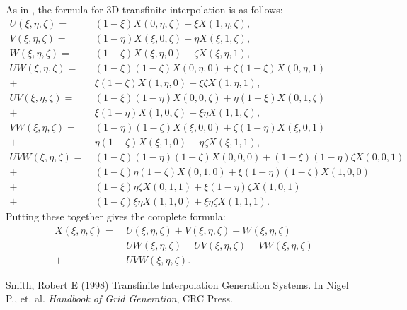 \documentclass{article}
\newcommand{\ba}[1]{\begin{align*}    #1    \end{align*}}
\begin{document}
As in \cite{smith}, the formula for 3D transfinite interpolation is as follows:
\ba{
U(\xi, \eta, \zeta) = & \ (1-\xi)X(0,\eta, \zeta) + \xi X(1,\eta, \zeta), \\
V(\xi, \eta, \zeta) = & \ (1-\eta)X(\xi, 0, \zeta) + \eta X(\xi, 1, \zeta), \\
W(\xi, \eta, \zeta) = & \ (1-\zeta)X(\xi, \eta, 0) + \zeta X(\xi, \eta, 1), \\
UW(\xi, \eta, \zeta) = & \ (1-\xi)(1-\zeta) X(0, \eta, 0) + \zeta (1-\xi) X(0, \eta, 1)  \\
+ & \ \xi (1-\zeta) X(1,\eta, 0) + \xi \zeta X(1, \eta, 1), \\
UV(\xi, \eta, \zeta) = & \ (1-\xi)(1-\eta)X(0,0,\zeta) + \eta (1-\xi) X(0,1,\zeta)  \\
+ & \ \xi (1-\eta) X(1,0,\zeta) + \xi \eta X(1,1,\zeta), \\
VW(\xi, \eta, \zeta) = & \ (1-\eta)(1-\zeta)X(\xi,0,0) + \zeta (1-\eta) X(\xi, 0, 1)  \\
+ & \ \eta (1-\zeta) X(\xi, 1, 0) + \eta \zeta X(\xi, 1,1),  \\
UVW(\xi, \eta, \zeta) = & \ (1-\xi)(1-\eta)(1-\zeta)X(0,0,0) + (1-\xi)(1-\eta) \zeta X(0,0,1)  \\
+ & \ (1-\xi) \eta (1-\zeta) X(0,1,0) + \xi (1-\eta)(1- \zeta) X(1,0,0) \\
+ & \ (1-\xi) \eta \zeta X(0,1,1) + \xi (1-\eta) \zeta X(1,0,1) \\
+ & \ (1-\zeta) \xi \eta  X(1,1,0) + \xi \eta \zeta  X(1,1,1).
}
Putting these together gives the complete formula:
\ba{
X(\xi, \eta, \zeta) = & \  U(\xi, \eta, \zeta) + V(\xi, \eta, \zeta) + W(\xi, \eta, \zeta) \\
 - & \ UW(\xi, \eta, \zeta) - UV(\xi, \eta, \zeta) - VW(\xi, \eta, \zeta) \\
 + & \  UVW(\xi, \eta, \zeta).
}


\begin{thebibliography}{}
 Smith, Robert E (1998) Transfinite Interpolation Generation Systems. In Nigel P., et. al. {\it Handbook of Grid Generation}, CRC Press.
\end{thebibliography}
\end{document}
